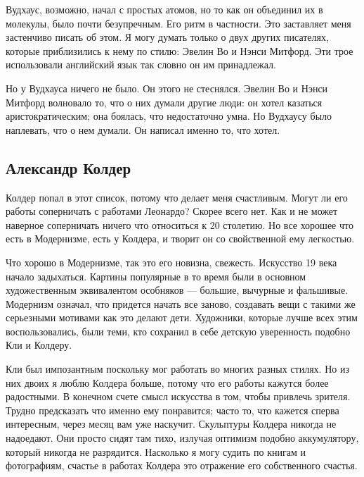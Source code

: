\documentclass[ebook,12pt,oneside,openany]{memoir}
\begin{document}
Вудхаус, возможно, начал с простых атомов, но то как он объединил их в
молекулы, было почти безупречным. Его ритм в частности. Это заставляет
меня застенчиво писать об этом. Я могу думать только о двух других
писателях, которые приблизились к нему по стилю: Эвелин Во и Нэнси
Митфорд. Эти трое использовали английский язык так словно он им
принадлежал. \newline

Но у Вудхауса ничего не было. Он этого не стеснялся. Эвелин Во и Нэнси
Митфорд волновало то, что о них думали другие люди: он хотел казаться
аристократическим; она боялась, что недостаточно умна. Но Вудхаусу
было наплевать, что о нем думали. Он написал именно то, что хотел. \newline

\subsection{Александр Колдер}

Колдер попал в этот список, потому что делает меня счастливым. Могут
ли его работы соперничать с работами Леонардо? Скорее всего нет. Как и
не может наверное соперничать ничего что относиться к 20 столетию. Но
все хорошее что есть в Модернизме, есть у Колдера, и творит он со
свойственной ему легкостью. \newline

Что хорошо в Модернизме, так это его новизна, свежесть. Искусство 19
века начало задыхаться. Картины популярные в то время были в основном
художественным эквивалентом особняков — большие, вычурные и фальшивые.
Модернизм означал, что придется начать все заново, создавать вещи с
такими же серьезными мотивами как это делают дети. Художники, которые
лучше всех этим воспользовались, были теми, кто сохранил в себе
детскую уверенность подобно Кли и Колдеру. \newline

Кли был импозантным поскольку мог работать во многих разных стилях. Но
из них двоих я люблю Колдера больше, потому что его работы кажутся
более радостными. В конечном счете смысл искусства в том, чтобы
привлечь зрителя. Трудно предсказать что именно ему понравится; часто
то, что кажется сперва интересным, через месяц вам уже наскучит.
Скульптуры Колдера никогда не надоедают. Они просто сидят там тихо,
излучая оптимизм подобно аккумулятору, который никогда не разрядится.
Насколько я могу судить по книгам и фотографиям, счастье в работах
Колдера это отражение его собственного счастья. \newline
\end{document}
